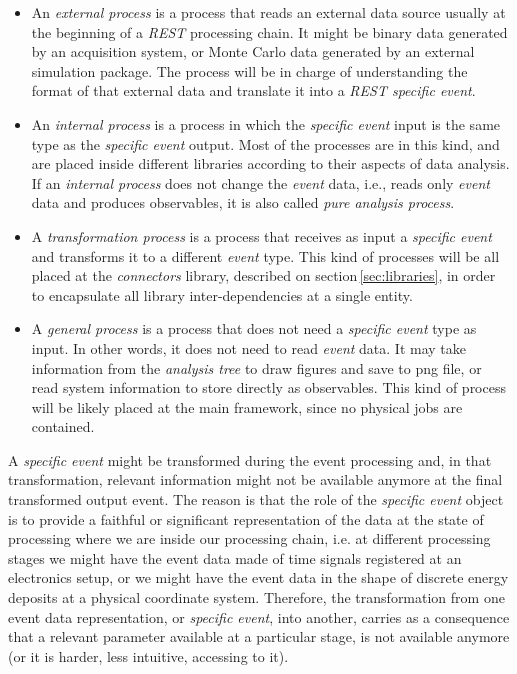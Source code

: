 \begin{itemize}
\item An \emph{external process} is a process that reads an external data source usually at the beginning of a \emph{REST} processing chain. It might be binary data generated by an acquisition system, or Monte Carlo data generated by an external simulation package. The process will be in charge of understanding the format of that external data and translate it into a \emph{REST specific event}.

\item An \emph{internal process} is a process in which the \emph{specific event} input is the same type as the \emph{specific event} output. Most of the processes are in this kind, and are placed inside different libraries according to their aspects of data analysis. If an \emph{internal process} does not change the \emph{event} data, i.e., reads only \emph{event} data and produces observables, it is also called \emph{pure analysis process}. 


\item A \emph{transformation process} is a process that receives as input a \emph{specific event} and transforms it to a different \emph{event} type. This kind of processes will be all placed at the \emph{connectors} library, described on section\,\ref{sec:libraries}, in order to encapsulate all library inter-dependencies at a single entity. 

\item A \emph{general process} is a process that does not need a \emph{specific event} type as input. In other words, it does not need to read \emph{event} data. It may take information from the \emph{analysis tree} to draw figures and save to png file, or read system information to store directly as observables. This kind of process will be likely placed at the main framework, since no physical jobs are contained.
\end{itemize}



A \emph{specific event} might be transformed during the event processing and, in that transformation, relevant information might not be available anymore at the final transformed output event. The reason is that the role of the \emph{specific event} object is to provide a faithful or significant representation of the data at the state of processing where we are inside our processing chain, i.e. at different processing stages we might have the event data made of time signals registered at an electronics setup, or we might have the event data in the shape of discrete energy deposits at a physical coordinate system. Therefore, the transformation from one event data representation, or \emph{specific event}, into another, carries as a consequence that a relevant parameter available at a particular stage, is not available anymore (or it is harder, less intuitive, accessing to it). 

